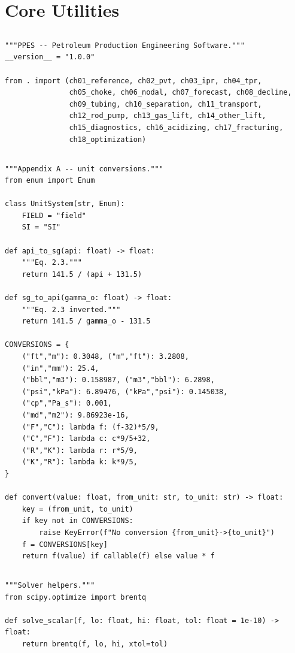 \documentclass[10pt,a4paper,openany]{book}
\begin{document}
\part{Core Utilities}

\chapter{}
\begin{lstlisting}
"""PPES -- Petroleum Production Engineering Software."""
__version__ = "1.0.0"

from . import (ch01_reference, ch02_pvt, ch03_ipr, ch04_tpr,
               ch05_choke, ch06_nodal, ch07_forecast, ch08_decline,
               ch09_tubing, ch10_separation, ch11_transport,
               ch12_rod_pump, ch13_gas_lift, ch14_other_lift,
               ch15_diagnostics, ch16_acidizing, ch17_fracturing,
               ch18_optimization)
\end{lstlisting}

\chapter{}
\begin{lstlisting}
"""Appendix A -- unit conversions."""
from enum import Enum

class UnitSystem(str, Enum):
    FIELD = "field"
    SI = "SI"

def api_to_sg(api: float) -> float:
    """Eq. 2.3."""
    return 141.5 / (api + 131.5)

def sg_to_api(gamma_o: float) -> float:
    """Eq. 2.3 inverted."""
    return 141.5 / gamma_o - 131.5

CONVERSIONS = {
    ("ft","m"): 0.3048, ("m","ft"): 3.2808,
    ("in","mm"): 25.4,
    ("bbl","m3"): 0.158987, ("m3","bbl"): 6.2898,
    ("psi","kPa"): 6.89476, ("kPa","psi"): 0.145038,
    ("cp","Pa_s"): 0.001,
    ("md","m2"): 9.86923e-16,
    ("F","C"): lambda f: (f-32)*5/9,
    ("C","F"): lambda c: c*9/5+32,
    ("R","K"): lambda r: r*5/9,
    ("K","R"): lambda k: k*9/5,
}

def convert(value: float, from_unit: str, to_unit: str) -> float:
    key = (from_unit, to_unit)
    if key not in CONVERSIONS:
        raise KeyError(f"No conversion {from_unit}->{to_unit}")
    f = CONVERSIONS[key]
    return f(value) if callable(f) else value * f
\end{lstlisting}

\chapter{}
\begin{lstlisting}
"""Solver helpers."""
from scipy.optimize import brentq

def solve_scalar(f, lo: float, hi: float, tol: float = 1e-10) -> float:
    return brentq(f, lo, hi, xtol=tol)
\end{lstlisting}
\end{document}
